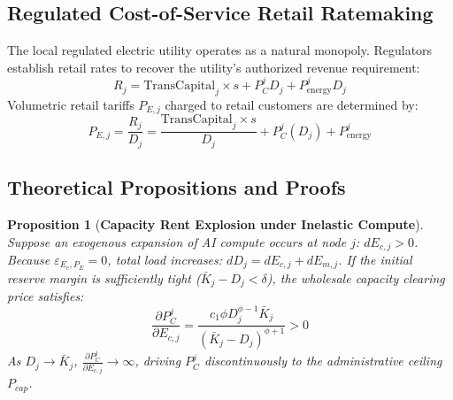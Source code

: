 \documentclass[11pt,a4paper]{article}
\newtheorem{proposition}{Proposition}
\begin{document}
\subsection{Regulated Cost-of-Service Retail Ratemaking}

The local regulated electric utility operates as a natural monopoly. Regulators establish retail rates to recover the utility's authorized revenue requirement:
\begin{equation}
    R_j = \text{TransCapital}_j \times s + P_C^j D_j + P_{\text{energy}}^j D_j
\end{equation}
Volumetric retail tariffs $P_{E,j}$ charged to retail customers are determined by:
\begin{equation}\label{eq:retail_tariff}
    P_{E,j} = \frac{R_j}{D_j} = \frac{\text{TransCapital}_j \times s}{D_j} + P_C^j(D_j) + P_{\text{energy}}^j
\end{equation}

\subsection{Theoretical Propositions and Proofs}

\begin{proposition}[\textbf{Capacity Rent Explosion under Inelastic Compute}]\label{prop:rent}
Suppose an exogenous expansion of AI compute occurs at node $j$: $dE_{c,j} > 0$. Because $\varepsilon_{E_c, P_E} = 0$, total load increases: $dD_j = dE_{c,j} + dE_{m,j}$. If the initial reserve margin is sufficiently tight ($\bar{K}_j - D_j < \delta$), the wholesale capacity clearing price satisfies:
\begin{equation}
    \frac{\partial P_C^j}{\partial E_{c,j}} = \frac{c_1 \phi D_j^{\phi-1} \bar{K}_j}{(\bar{K}_j - D_j)^{\phi+1}} > 0
\end{equation}
As $D_j \to \bar{K}_j$, $\frac{\partial P_C^j}{\partial E_{c,j}} \to \infty$, driving $P_C^j$ discontinuously to the administrative ceiling $P_{cap}$.
\end{proposition}
\end{document}
